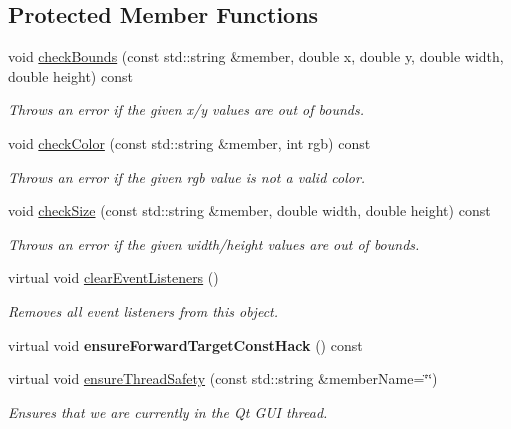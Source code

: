 \subsection*{Protected Member Functions}
\begin{DoxyCompactItemize}
\item 
void \mbox{\hyperlink{classsgl_1_1GDrawingSurface_a3a690bcb2d62250c9e4722ad7c1b9ab6}{check\+Bounds}} (const std\+::string \&member, double x, double y, double width, double height) const
\begin{DoxyCompactList}\small\item\em Throws an error if the given x/y values are out of bounds. \end{DoxyCompactList}\item 
void \mbox{\hyperlink{classsgl_1_1GDrawingSurface_a9841b5dc607ca41a14819d80e1d8a09c}{check\+Color}} (const std\+::string \&member, int rgb) const
\begin{DoxyCompactList}\small\item\em Throws an error if the given rgb value is not a valid color. \end{DoxyCompactList}\item 
void \mbox{\hyperlink{classsgl_1_1GDrawingSurface_a70a6546707ae708573396616bd0f5320}{check\+Size}} (const std\+::string \&member, double width, double height) const
\begin{DoxyCompactList}\small\item\em Throws an error if the given width/height values are out of bounds. \end{DoxyCompactList}\item 
virtual void \mbox{\hyperlink{classsgl_1_1GObservable_a80cfa040459ff53594adbd6a51ec8f43}{clear\+Event\+Listeners}} ()
\begin{DoxyCompactList}\small\item\em Removes all event listeners from this object. \end{DoxyCompactList}\item 
virtual void {\bfseries ensure\+Forward\+Target\+Const\+Hack} () const
\item 
virtual void \mbox{\hyperlink{classsgl_1_1GObservable_a284f31528c0520f8e545c03ac9eeac74}{ensure\+Thread\+Safety}} (const std\+::string \&member\+Name=\char`\"{}\char`\"{})
\begin{DoxyCompactList}\small\item\em Ensures that we are currently in the Qt G\+UI thread. \end{DoxyCompactList}\item 

\end{DoxyCompactItemize}
